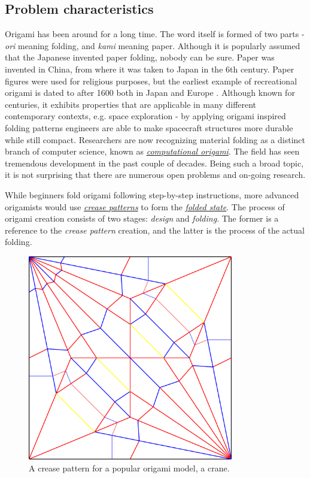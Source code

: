 \subsection{Problem characteristics}
Origami has been around for a long time. 
The word itself is formed of two parts - \textit{ori} meaning folding, and \textit{kami} meaning paper. 
Although it is popularly assumed that the Japanese invented paper folding, nobody can be sure.
Paper was invented in China, from where it was taken to Japan in the 6th century.
Paper figures were used for religious purposes, but the earliest example of recreational origami 
is dated to after 1600 both in Japan and Europe \cite{origami-bible}.
Although known for centuries, it exhibits properties that are applicable 
in many different contemporary contexts, e.g.
space exploration \cite{origami-in-orbit} \cite{solar-panel-origami} - by applying origami inspired folding patterns
engineers are able to make spacecraft structures more durable while still compact.
Researchers are now recognizing material folding as a distinct
branch of computer science, known as \hyperref[dictionary:computational-origami]{\textit{computational origami}}.
The field has seen tremendous development in the past couple of decades.
Being such a broad topic, it is not surprising that there are numerous open problems\cite{mit-open-problems} and on-going research.


While beginners fold origami following step-by-step instructions,
more advanced origamists would use \hyperref[dictionary:crease-pattern]{\textit{crease patterns}}
to form the \hyperref[dictionary:folded-state]{\textit{folded state}}.
The process of origami creation consists of two stages: \textit{design} and \textit{folding}.
The former is a reference to the \textit{crease pattern} creation, and the latter is the process of the actual folding.

\begin{figure}[H]
\caption{A crease pattern for a popular origami model, a crane.\label{fig:creasepattern}}
  \centering
    \includegraphics[width=0.8\textwidth]{assets/crane-crease-pattern.png}
\end{figure}

